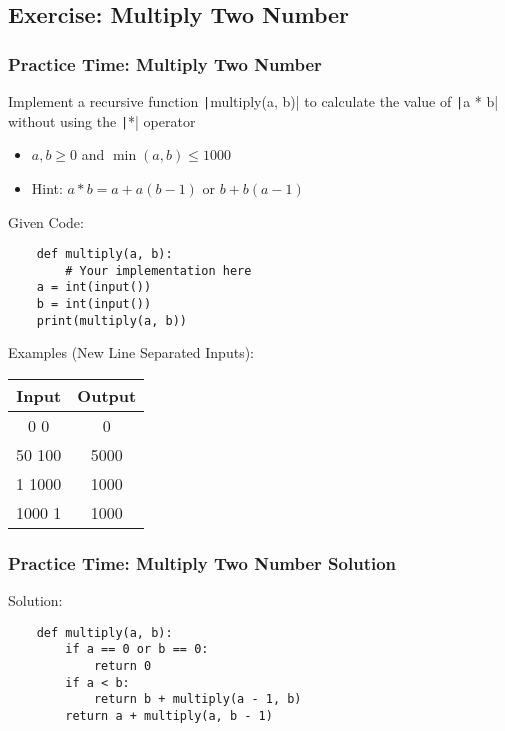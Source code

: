 \documentclass{beamer}
\newcommand{\python}[1]{\texttt|#1|}
\begin{document}
\subsection{Exercise: Multiply Two Number}
\begin{frame}[fragile]
    \frametitle{Practice Time: Multiply Two Number}

    Implement a recursive function \python{multiply(a, b)} to
    calculate the value of \python{a * b} without using the \python{*} operator
    \begin{itemize}
        \item $a, b \ge 0$ and $\min(a, b) \le 1000$
        \item Hint: $a * b = a + a(b - 1)$ or $b + b(a - 1)$
    \end{itemize}
    Given Code:
    \begin{verbatim}
    def multiply(a, b):
        # Your implementation here
    a = int(input())
    b = int(input())
    print(multiply(a, b))
    \end{verbatim}

    Examples (New Line Separated Inputs):
    \begin{center}
        \small
        \begin{tabular}{|c|c|}
            \hline
            Input  & Output \\ \hline
            0 0    & 0      \\ \hline
            50 100 & 5000   \\ \hline
            1 1000 & 1000   \\ \hline
            1000 1 & 1000   \\ \hline
        \end{tabular}
    \end{center}
\end{frame}
\begin{frame}[fragile]
    \frametitle{Practice Time: Multiply Two Number Solution}

    Solution:
    \begin{verbatim}
    def multiply(a, b):
        if a == 0 or b == 0:
            return 0
        if a < b:
            return b + multiply(a - 1, b)
        return a + multiply(a, b - 1)
    \end{verbatim}
\end{frame}
\end{document}
